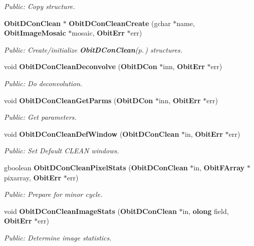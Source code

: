 \begin{CompactItemize}
\begin{CompactList}\small\item\em Public: Copy structure. \item\end{CompactList}\item 
{\bf Obit\-DCon\-Clean} $\ast$ {\bf Obit\-DCon\-Clean\-Create} (gchar $\ast$name, {\bf Obit\-Image\-Mosaic} $\ast$mosaic, {\bf Obit\-Err} $\ast$err)
\begin{CompactList}\small\item\em Public: Create/initialize {\bf Obit\-DCon\-Clean}{\rm (p.\,\pageref{structObitDConClean})} structures. \item\end{CompactList}\item 
void {\bf Obit\-DCon\-Clean\-Deconvolve} ({\bf Obit\-DCon} $\ast$inn, {\bf Obit\-Err} $\ast$err)
\begin{CompactList}\small\item\em Public: Do deconvolution. \item\end{CompactList}\item 
void {\bf Obit\-DCon\-Clean\-Get\-Parms} ({\bf Obit\-DCon} $\ast$inn, {\bf Obit\-Err} $\ast$err)
\begin{CompactList}\small\item\em Public: Get parameters. \item\end{CompactList}\item 
void {\bf Obit\-DCon\-Clean\-Def\-Window} ({\bf Obit\-DCon\-Clean} $\ast$in, {\bf Obit\-Err} $\ast$err)
\begin{CompactList}\small\item\em Public: Set Default CLEAN windows. \item\end{CompactList}\item 
gboolean {\bf Obit\-DCon\-Clean\-Pixel\-Stats} ({\bf Obit\-DCon\-Clean} $\ast$in, {\bf Obit\-FArray} $\ast$pixarray, {\bf Obit\-Err} $\ast$err)
\begin{CompactList}\small\item\em Public: Prepare for minor cycle. \item\end{CompactList}\item 
void {\bf Obit\-DCon\-Clean\-Image\-Stats} ({\bf Obit\-DCon\-Clean} $\ast$in, {\bf olong} field, {\bf Obit\-Err} $\ast$err)
\begin{CompactList}\small\item\em Public: Determine image statistics. \item\end{CompactList}\item 

\end{CompactItemize}
